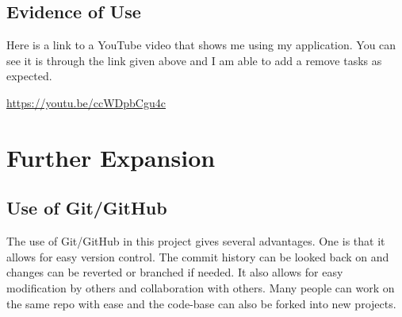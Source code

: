 \documentclass[12pt]{extarticle}
\begin{document}
\subsection{Evidence of Use}
Here is a link to a YouTube video that shows me using my application. You can see it is through the link given above and I am able to add a remove tasks as expected. 

\url{https://youtu.be/ccWDpbCgu4c}


\section{Further Expansion}
\subsection{Use of Git/GitHub}
The use of Git/GitHub in this project gives several advantages. One is that it allows for easy version control. The commit history can be looked back on and changes can be reverted or branched if needed. It also allows for easy modification by others and collaboration with others. Many people can work on the same repo with ease and the code-base can also be forked into new projects. 
\end{document}
